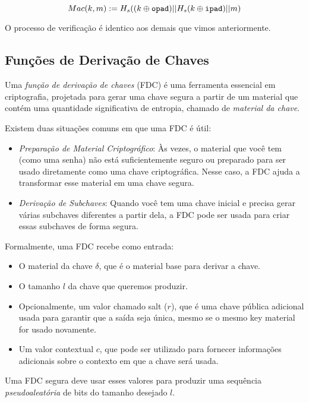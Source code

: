 \begin{displaymath}
Mac(k, m) := H_s((k \oplus \textrm{\tt opad}) || H_s(k \oplus \textrm{\tt ipad}) || m)
\end{displaymath}

O processo de verificação é identico aos demais que vimos anteriormente.

\subsection{Funções de Derivação de Chaves}
\label{sec:kdf}

Uma {\em função de derivação de chaves} (FDC) é uma ferramenta essencial em criptografia, projetada para gerar uma chave segura a partir de um material que contém uma quantidade significativa de entropia, chamado de {\em material da chave}.

Existem duas situações comuns em que uma FDC é útil:

\begin{itemize}
\item[] {\em Preparação de Material Criptográfico}:
  Às vezes, o material que você tem (como uma senha) não está suficientemente seguro ou preparado para ser usado diretamente como uma chave criptográfica.
  Nesse caso, a FDC ajuda a transformar esse material em uma chave segura.

\item[] {\em Derivação de Subchaves}:
  Quando você tem uma chave inicial e precisa gerar várias subchaves diferentes a partir dela, a FDC pode ser usada para criar essas subchaves de forma segura.
\end{itemize}

Formalmente, uma FDC recebe como entrada:

\begin{itemize}
\item[] O material da chave $\delta$, que é o material base para derivar a chave.
\item[] O tamanho $l$ da chave que queremos produzir.
\item[] Opcionalmente, um valor chamado salt ($r$), que é uma chave pública adicional usada para garantir que a saída seja única, mesmo se o mesmo key material for usado novamente.
\item[] Um valor contextual $c$, que pode ser utilizado para fornecer informações adicionais sobre o contexto em que a chave será usada.
\end{itemize}

Uma FDC segura deve usar esses valores para produzir uma sequência {\em pseudoaleatória} de bits do tamanho desejado $l$.

